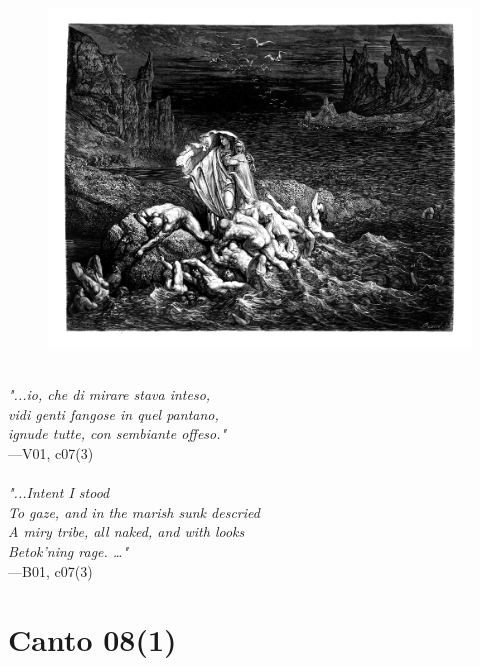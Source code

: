\documentclass[../Dore_vision.tex]{subfiles}
\begin{document}
\begin{figure}[ht]
\centering
\includegraphics[height=\figsize]{illustrations/book_1/V01, c07(3).jpg}
\end{figure}

\begin{center}
\begin{minipage}{0.8\linewidth}
\textit{\\
"...io, che di mirare stava inteso,\\vidi genti fangose in quel pantano,\\ignude tutte, con sembiante offeso."} \\
—V01, c07(3) \\~\\
\textit{"...Intent I stood\\To gaze, and in the marish sunk descried\\A miry tribe, all naked, and with looks\\Betok'ning rage. …"} \\
—B01, c07(3)
\end{minipage}
\end{center}

\newpage

\section{Canto 08(1)}
\end{document}

